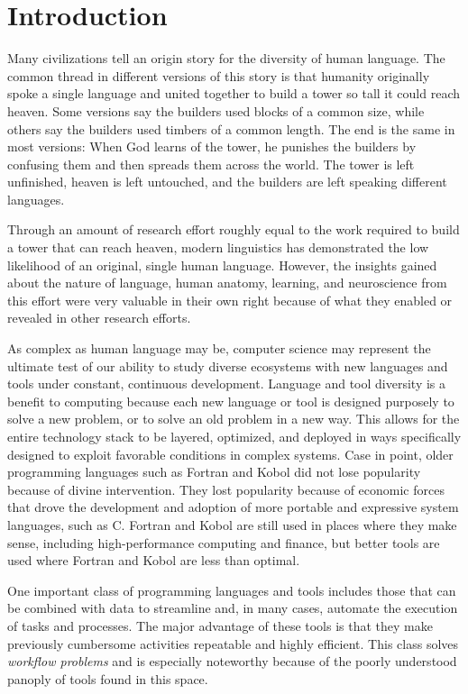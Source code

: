 \chapter{Introduction} \label{ch:introduction}

Many civilizations tell an origin story for the diversity of human language. The
common thread in different versions of this story is that humanity
originally spoke a single language and united together to build a tower so tall
it could reach heaven. Some versions say the builders used blocks of
a common size, while others say the builders used timbers of a common
length. The end is the same in most versions: When God learns of the
tower, he punishes the builders by confusing them and then spreads them across
the world. The tower is left unfinished, heaven is left untouched, and the
builders are left speaking different languages.

Through an amount of research effort roughly equal to the work required
to build a tower that can reach heaven, modern linguistics has demonstrated the
low likelihood of an original, single human language. However, the insights gained
about the nature of language, human anatomy, learning, and neuroscience from
this effort were very valuable in their own right because of what they enabled or
revealed in other research efforts.

As complex as human language may be, computer science may represent the ultimate
test of our ability to study diverse ecosystems with new languages and tools
under constant, continuous development. Language and tool diversity is a
benefit to computing because each new language or tool is designed purposely to
solve a new problem, or to solve an old problem in a new way. This allows for
the entire technology stack to  be layered, optimized, and deployed in ways
specifically designed to exploit favorable conditions in complex systems. Case
in point, older programming languages such as Fortran and Kobol did not lose
popularity because of divine intervention. They lost popularity because of
economic forces that drove the development and adoption of more portable and
expressive system languages, such as C. Fortran and Kobol are still used in
places where they make sense, including high-performance computing and finance,
but better tools are used where Fortran and Kobol are less than optimal.

One important class of programming languages and tools includes those that
can be combined with data to streamline and, in many cases, automate the
execution of tasks and processes. The major advantage of these tools is that
they make previously cumbersome activities repeatable and highly efficient.
This class solves \textit{workflow problems} and is especially noteworthy
because of the poorly understood panoply of tools found in this space.

